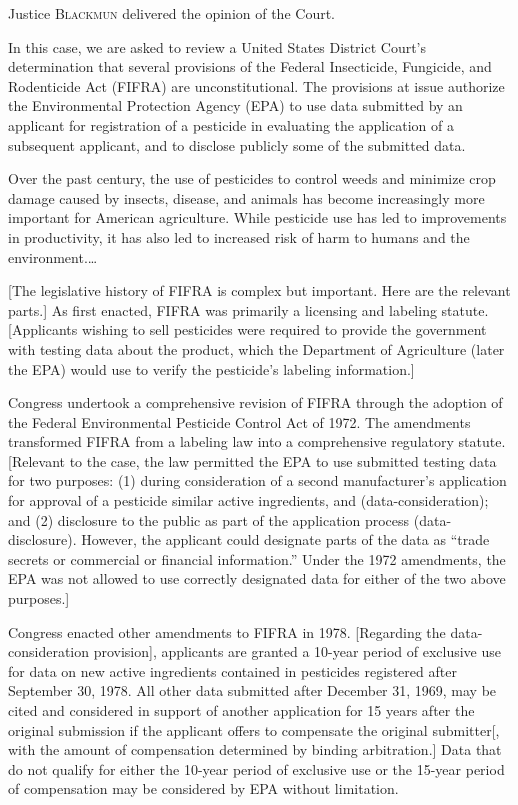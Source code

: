 
\opinion Justice \textsc{Blackmun} delivered the opinion of the Court.

In this case, we are asked to review a United States District Court's
determination that several provisions of the Federal Insecticide, Fungicide, and
Rodenticide Act (FIFRA)
are unconstitutional. The provisions at issue authorize the Environmental
Protection Agency (EPA) to use data submitted by an applicant for registration
of a pesticide in evaluating the application of a subsequent applicant,
and to disclose publicly some of the submitted data.




Over the past century, the use of pesticides to control weeds and minimize crop
damage caused by insects, disease, and animals has become increasingly more
important for American agriculture.
While pesticide use has led to improvements in productivity, it has also led to
increased risk of harm to humans and the environment.\ldots

[The legislative history of FIFRA is complex but important. Here are the
relevant parts.]
As first enacted, FIFRA was primarily a licensing and labeling statute.
[Applicants wishing to sell pesticides were required to provide the government
with testing data about the product, which the Department of Agriculture (later
the EPA) would use to verify the pesticide's labeling information.]


Congress undertook a comprehensive revision of FIFRA through
the adoption of the Federal Environmental Pesticide Control Act of 1972.
The amendments transformed FIFRA from a labeling law into a
comprehensive regulatory statute. [Relevant to the case, the law permitted the
EPA to use submitted testing data for two purposes: (1)
during consideration of a second manufacturer's application for approval
of a pesticide similar active ingredients, and
(data-consideration); and
(2) disclosure to the public as part of the application process
(data-disclosure).
However, the applicant could designate parts of the data as ``trade secrets or
commercial or financial information.'' Under the 1972 amendments, the EPA was
not allowed to use correctly designated data for either of the two above
purposes.]

Congress enacted other amendments to FIFRA in 1978. [Regarding the
data-consideration provision],
applicants are granted a 10-year period of exclusive use for data on new active
ingredients contained in pesticides registered after September 30, 1978. All
other data submitted after December 31, 1969, may be cited and considered in
support of another application for 15 years after the original submission if the
applicant offers to compensate the original submitter[, with the amount of
compensation determined by binding arbitration.] Data that do not qualify for
either the 10-year period of exclusive use or the 15-year period of compensation
may be considered by EPA without limitation.

